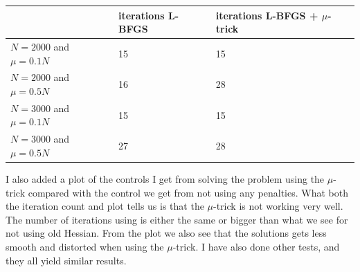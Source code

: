 \documentclass[11pt,a4paper]{article}
\begin{document}
\begin{center}
    \begin{tabular}{| l | l | l |}
    \hline
     & iterations L-BFGS & iterations  L-BFGS + $\mu$-trick \\ \hline
    $N=2000$ and $\mu=0.1N$ &  15 & 15 \\ \hline
    $N=2000$ and $\mu=0.5N$&  16 &  28	\\ \hline
    $N=3000$ and $\mu=0.1N$ &  15 & 15 \\ \hline
    $N=3000$ and $\mu=0.5N$&  27 &  28	\\ \hline
    \end{tabular}
\end{center}
I also added a plot of the controls I get from solving the problem using the $\mu$-trick compared with the control we get from not using any penalties. What both the iteration count and plot tells us is that the $\mu$-trick is not working very well. The number of iterations using is either the same or bigger than what we see for not using old Hessian. From the plot we also see that the solutions gets less smooth and distorted when using the $\mu$-trick. I have also done other tests, and they all yield similar results.
\end{document}
